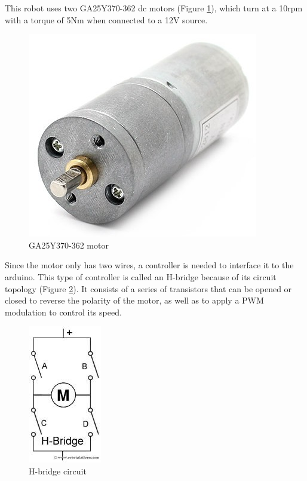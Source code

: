 	This robot uses two GA25Y370-362 dc motors (Figure \ref{dc-motor}), which turn at a 10rpm with a torque of 5Nm when connected to a 12V source. 

		\begin{figure}[H]
			\centering
			\includegraphics[scale=0.4]{images/ProjectComponents/motor.jpg}
			\caption{GA25Y370-362 motor }
			\label{dc-motor}
		\end{figure}
		\bigskip

	Since the motor only has two wires, a controller is needed to interface it to the arduino. This type of controller is called an H-bridge because of its circuit topology (Figure \ref{h-bridge}). It consists of a series of transistors that can be opened or closed to reverse the polarity of the motor, as well as to apply a PWM modulation to control its speed.\\

		\begin{figure}[H]
			\centering
			\includegraphics[scale=0.6]{images/ProjectComponents/h-bridge.jpg}
			\caption{H-bridge circuit }
			\label{h-bridge}
		\end{figure}
		\bigskip

